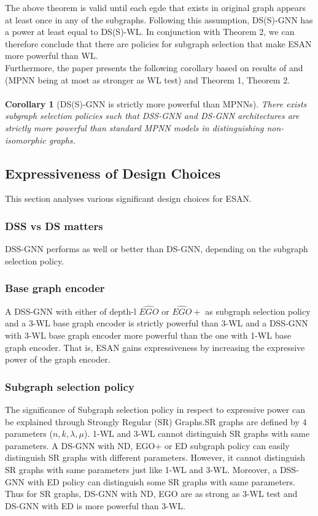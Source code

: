 \documentclass[11pt, dvipsnames, DIV=12]{scrreprt}
\theoremstyle{definition}
\begin{document}
The above theorem is valid until each egde that exists in original graph appears at least once in any of the subgraphs. Following this assumption, DS(S)-GNN has a power at least equal to DS(S)-WL. In conjunction with Theorem 2, we can therefore conclude that there are policies for subgraph selection that make ESAN more powerful than WL.\\
Furthermore, the paper presents the following corollary based on  results of \citep{xu_power_nn_2019} and \citep{christopher_higher_order_gnn_2019} (MPNN being at most as stronger as WL test) and Theorem 1, Theorem 2.\\\\
\textbf{Corollary 1} (DS(S)-GNN is strictly more powerful than MPNNs). \textit{There exists subgraph selection policies such that DSS-GNN and DS-GNN architectures are strictly more powerful than standard MPNN models in distinguishing non-isomorphic graphs.}

\subsection{Expressiveness of Design Choices}
This section analyses various significant design choices for ESAN. 
\subsubsection{DSS vs DS matters} DSS-GNN performs as well or better than DS-GNN, depending on the subgraph selection policy.
\subsubsection{Base graph encoder} A DSS-GNN with either of depth-l $\widehat{EGO}$ or $\widehat{EGO}+$ as subgraph selection policy and a 3-WL base graph encoder is strictly powerful than 3-WL and a DSS-GNN with 3-WL base graph encoder more powerful than the one with 1-WL base graph encoder. That is, ESAN gains expressiveness by increasing the expressive power of the graph encoder.
\subsubsection{Subgraph selection policy} The significance of Subgraph selection policy in respect to expressive power can be explained through Strongly Regular (SR) Graphs.SR graphs are defined by 4 parameters ($n,k,\lambda,\mu$). 1-WL and 3-WL cannot distinguish SR graphs with same parameters. A DS-GNN with ND, EGO+ or ED subgraph policy can easily distinguish SR graphs with different parameters. However, it cannot distinguish SR graphs with same parameters just like 1-WL and 3-WL. Moreover, a DSS-GNN with ED policy can distinguish some SR graphs with same parameters. Thus for SR graphs, DS-GNN with ND, EGO are as strong as 3-WL test and DS-GNN with ED is more powerful than 3-WL.
\end{document}
